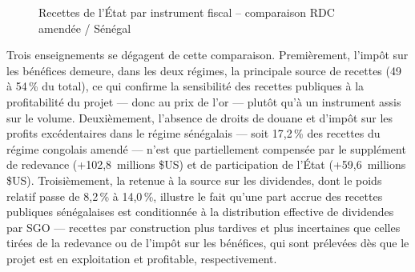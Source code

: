 \begin{figure}[H]
\centering
{}
\caption{Recettes de l'État par instrument fiscal -- comparaison RDC amendée / Sénégal}
\label{fig:instruments}
\end{figure}

Trois enseignements se dégagent de cette comparaison. Premièrement, l'impôt sur les bénéfices demeure, dans les deux régimes, la principale source de recettes (49 à 54\,\% du total), ce qui confirme la sensibilité des recettes publiques à la profitabilité du projet --- donc au prix de l'or --- plutôt qu'à un instrument assis sur le volume. Deuxièmement, l'absence de droits de douane et d'impôt sur les profits excédentaires dans le régime sénégalais --- soit 17,2\,\% des recettes du régime congolais amendé --- n'est que partiellement compensée par le supplément de redevance (+102,8~millions \$US) et de participation de l'État (+59,6~millions \$US). Troisièmement, la retenue à la source sur les dividendes, dont le poids relatif passe de 8,2\,\% à 14,0\,\%, illustre le fait qu'une part accrue des recettes publiques sénégalaises est conditionnée à la distribution effective de dividendes par SGO --- recettes par construction plus tardives et plus incertaines que celles tirées de la redevance ou de l'impôt sur les bénéfices, qui sont prélevées dès que le projet est en exploitation et profitable, respectivement.

